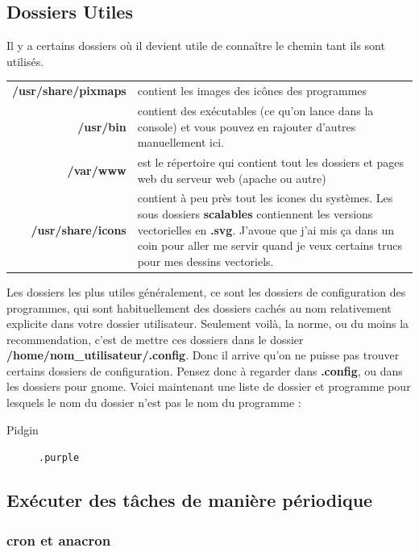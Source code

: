 \documentclass[a4paper,twoside]{article}
\begin{document}
\subsection{Dossiers Utiles}
Il y a certains dossiers où il devient utile de connaître le chemin tant ils sont utilisés.

\begin{tabular}{>{\bfseries}r<{}@{ : }p{9cm}}
/usr/share/pixmaps & contient les images des icônes des programmes\\
/usr/bin & contient des exécutables (ce qu'on lance dans la console) et vous pouvez en rajouter d'autres manuellement ici.\\
/var/www & est le répertoire qui contient tout les dossiers et pages web du serveur web (apache ou autre)\\
/usr/share/icons & contient à peu près tout les icones du systèmes. Les sous dossiers \textbf{scalables} contiennent les versions vectorielles en \textbf{.svg}. J'avoue que j'ai mis ça dans un coin pour aller me servir quand je veux certains trucs pour mes dessins vectoriels.
\end{tabular}

Les dossiers les plus utiles généralement, ce sont les dossiers de configuration des programmes, qui sont habituellement des dossiers cachés au nom relativement explicite dans votre dossier utilisateur. Seulement voilà, la norme, ou du moins la recommendation, c'est de mettre ces dossiers dans le dossier \textbf{/home/nom\_utilisateur/.config}. Donc il arrive qu'on ne puisse pas trouver certains dossiers de configuration. Pensez donc à regarder dans \textbf{.config}, ou dans les dossiers pour gnome. Voici maintenant une liste de dossier et programme pour lesquels le nom du dossier n'est pas le nom du programme :

\begin{description}
\item[Pidgin] \verb|.purple|
\end{description}

\subsection{Exécuter des tâches de manière périodique}
\subsubsection{cron et anacron}\label{sec:cron}
\end{document}
